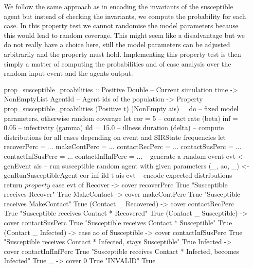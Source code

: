 We follow the same approach as in encoding the invariants of the susceptible agent but instead of checking the invariants, we compute the probability for each case. In this property test we cannot randomise the model parameters because this would lead to random coverage. This might seem like a disadvantage but we do not really have a choice here, still the model parameters can be adjusted arbitrarily and the property must hold. %
Implementing this property test is then simply a matter of computing the probabilities and of case analysis over the random input event and the agents output.

\begin{HaskellCode}
prop_susceptible_proabilities :: Positive Double      -- Current simulation time
                              -> NonEmptyList AgentId -- Agent ids of the population
                              -> Property
prop_susceptible_proabilities (Positive t) (NonEmpty ais) = do
  -- fixed model parameters, otherwise random coverage
  let cor = 5     -- contact rate (beta)
      inf = 0.05  -- infectivity (gamma)
      ild = 15.0  -- illness duration (delta)
  -- compute distributions for all cases depending on event and SIRState frequencies
  let recoverPerc       = ...
      makeContPerc      = ...
      contactRecPerc    = ...
      contactSusPerc    = ...
      contactInfSusPerc = ...
      contactInfInfPerc = ...
  -- generate a random event
  evt <- genEvent ais
  -- run susceptible random agent with given parameters
  (_, ao, _) <- genRunSusceptibleAgent cor inf ild t ais evt
  -- encode expected distributions
  return $ property $ case evt of 
    Recover -> 
      cover recoverPerc True "Susceptible receives Recover" True
    MakeContact -> 
      cover makeContPerc True "Susceptible receives MakeContact" True
    (Contact _ Recovered) -> 
      cover contactRecPerc True "Susceptible receives Contact * Recovered" True
    (Contact _ Susceptible) -> 
      cover contactSusPerc True "Susceptible receives Contact * Susceptible" True
    (Contact _ Infected) -> 
      case ao of
        Susceptible ->
          cover contactInfSusPerc True 
            "Susceptible receives Contact * Infected, stays Susceptible" True
        Infected ->
          cover contactInfInfPerc True 
            "Susceptible receives Contact * Infected, becomes Infected" True
        _ ->
          cover 0 True "INVALID" True
\end{HaskellCode}


